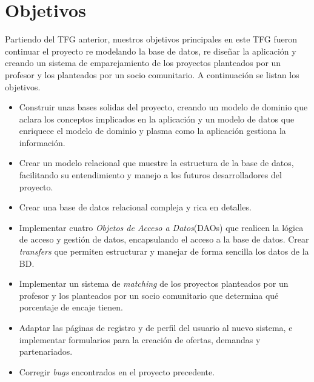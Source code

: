 \documentclass[11pt]{book}
\begin{document}
\section{Objetivos}
Partiendo del TFG anterior, nuestros objetivos principales en este TFG fueron continuar el proyecto re modelando la base de datos, re diseñar la aplicación y creando un sistema de emparejamiento de los proyectos planteados por un profesor y los planteados por un socio comunitario.
A continuación se listan los objetivos.
\begin{itemize} 
	\item Construir unas bases solidas del proyecto, creando un modelo de dominio que aclara los conceptos implicados en la aplicación y un modelo de datos que enriquece el modelo de dominio y plasma como la aplicación gestiona la información.
	\item Crear un modelo relacional que muestre la estructura de la base de datos, facilitando su entendimiento y manejo a los futuros desarrolladores del proyecto.
	\item Crear una base de datos relacional compleja y rica en detalles.
	\item Implementar cuatro \emph{Objetos de Acceso a Datos}(DAOs) que realicen la lógica de acceso y gestión de datos, encapsulando el acceso a la base de datos. Crear \textit{transfers} que permiten estructurar y manejar de forma sencilla los datos de la BD.
	\item Implementar un sistema de \textit{matching} de los proyectos planteados por un profesor y los planteados por un socio comunitario que determina qué porcentaje de encaje tienen.
	\item Adaptar las páginas de registro y de perfil del usuario al nuevo sistema, e implementar formularios para la creación de ofertas, demandas y partenariados.
	\item Corregir \textit{bugs} encontrados en el proyecto precedente.
\end{itemize}
\end{document}
